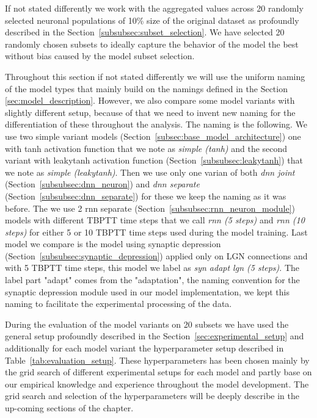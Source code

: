If not stated differently we work with the aggregated values across 20 randomly selected neuronal populations of 10\% size of the original dataset as profoundly described in the Section~\ref{subsubsec:subset_selection}. We have selected 20 randomly chosen subsets to ideally capture the behavior of the model the best without bias caused by the model subset selection.

Throughout this section if not stated differently we will use the uniform naming of the model types that mainly build on the namings defined in the Section~
\ref{sec:model_description}. However, we also compare some model variants with slightly different setup, because of that we need to invent new naming for the differentiation of these throughout the analysis. The naming is the following. We use two simple variant models (Section~\ref{subsec:base_model_architecture}) one with tanh activation function that we note as \emph{simple (tanh)} and the second variant with leakytanh activation function (Section~\ref{subsubsec:leakytanh}) that we note as \emph{simple (leakytanh)}. Then we use only one varian of both \emph{dnn joint} (Section~\ref{subsubsec:dnn_neuron}) and \emph{dnn separate} (Section~\ref{subsubsec:dnn_separate}) for these we keep the naming as it was before. The we use 2 rnn separate (Section~\ref{subsubsec:rnn_neuron_module}) models with different TBPTT time steps that we call \emph{rnn (5 steps)} and \emph{rnn (10 steps)} for either 5 or 10 TBPTT time steps used during the model training. Last model we compare is the model using synaptic depression (Section~\ref{subsubsec:synaptic_depression}) applied only on LGN connections and with 5 TBPTT time steps, this model we label as \emph{syn adapt lgn (5 steps)}. The label part "adapt" comes from the "adaptation", the naming convention for the synaptic depression module used in our model implementation, we kept this naming to facilitate the experimental processing of the data. 

During the evaluation of the model variants on 20 subsets we have used the general setup profoundly described in the Section~\ref{sec:experimental_setup} and additionally for each model variant the hyperparameter setup described in Table~\ref{tab:evaluation_setup}. These hyperparameters has been chosen mainly by the grid search of different experimental setups for each model and partly base on our empirical knowledge and experience throughout the model development. The grid search and selection of the hyperparameters will be deeply describe in the up-coming sections of the chapter.

